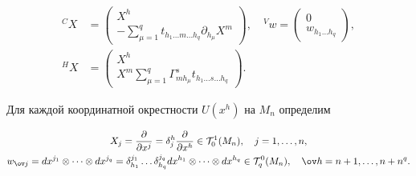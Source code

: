 \begin{equation}


\begin{split}


{}^CX&=\begin{pmatrix}


X^h \\ -\sum\limits^q_{\mu=1}t_{h_1\dotsc m\dotsc h_q}


\partial_{h_\mu}X^m


\end{pmatrix}


, \quad {}^Vw=\begin{pmatrix}


0 \\ w_{h_1\dotsc h_q}


\end{pmatrix}


,


\\
{}^HX&=\begin{pmatrix}


X^h \\ X^m\sum\limits^q_{\mu=1}\Gamma^s_{mh_\mu}


t_{h_1\dotsc s\dotsc h_q}


\end{pmatrix}


.


\end{split}


\end{equation}





Для каждой координатной окрестности  $U(x^h)$ на $M_n$ определим


\begin{gather*}


X_j=\frac{\partial}{\partial x^j}=\delta^h_j


\frac{\partial}{\partial x^h}\in{\cal T}^1_0(M_n),\quad j=1,\dotsc,n,\\


%


w_{{\ov j}}=dx^{j_1}\otimes \dotsb\otimes dx^{j_q}=


\delta^{j_1}_{h_1}\dotsc \delta^{j_q}_{h_q}


dx^{h_1}\otimes\dotsb\otimes dx^{h_q}\in


{\cal T}^0_q(M_n),\quad \ov h=n+1,\dotsc,n+n^q.


\end{gather*}


